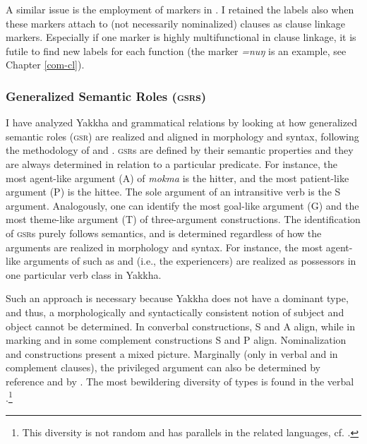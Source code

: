 A similar issue is the employment of  markers in . I retained the  labels also when these markers attach to (not necessarily nominalized) clauses as clause linkage markers. Especially if one  marker is highly multifunctional in clause linkage, it is futile to find new labels for each function (the  marker \emph{=nuŋ} is an example, see Chapter \ref{com-cl}).


\subsubsection{Generalized Semantic Roles (\textsc{gsr}s)}

I have analyzed Yakkha  and grammatical relations by looking at how generalized semantic roles (\textsc{gsr}) are realized and aligned in morphology and syntax, following the methodology of \citet{Bickel2010_Grammatical} and \citet{Witzlack2010_Typological}. \textsc{gsr}s are defined by their semantic properties and they are always determined in relation to a particular predicate. For instance, the most agent-like argument (A) of \emph{mokma}  is the hitter, and the most patient-like argument (P) is the hittee. The sole argument of an intransitive verb is the S argument. Analogously, one can identify the most goal-like argument (G) and the most theme-like argument (T) of three-argument constructions. The identification of \textsc{gsr}s purely follows semantics, and is determined regardless of how the arguments  are realized in morphology and syntax. For instance, the most agent-like arguments of  such as  and  (i.e., the experiencers) are realized as possessors in one particular verb class in Yakkha.  

Such an approach is necessary because Yakkha does not have a dominant  type, and thus, a morphologically and syntactically consistent notion of subject and object cannot be determined. In converbal constructions, S and A align, while in  marking and in some complement constructions S and P align. Nominalization and  constructions present a mixed picture. Marginally (only in verbal  and in complement clauses), the  privileged argument can also be determined by reference and by . The most bewildering diversity of  types is found in the verbal .\footnote{This diversity is not random and has parallels in the related languages, cf. .}   


